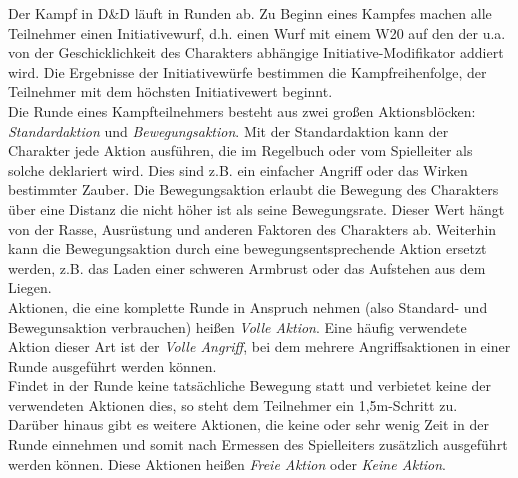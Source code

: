 Der Kampf in D\&D läuft in Runden ab. Zu Beginn eines Kampfes machen alle Teilnehmer einen Initiativewurf, d.h. einen Wurf mit einem W20 auf den der u.a. von der Geschicklichkeit des Charakters abhängige Initiative-Modifikator addiert wird. Die Ergebnisse der Initiativewürfe bestimmen die Kampfreihenfolge, der Teilnehmer mit dem höchsten Initiativewert beginnt.\\
Die Runde eines Kampfteilnehmers besteht aus zwei großen Aktionsblöcken: \emph{Standardaktion} und \emph{Bewegungsaktion}. Mit der Standardaktion kann der Charakter jede Aktion ausführen, die im Regelbuch oder vom Spielleiter als solche deklariert wird. Dies sind z.B. ein einfacher Angriff oder das Wirken bestimmter Zauber. Die Bewegungsaktion erlaubt die Bewegung des Charakters über eine Distanz die nicht höher ist als seine Bewegungsrate. Dieser Wert hängt von der Rasse, Ausrüstung und anderen Faktoren des Charakters ab. Weiterhin kann die Bewegungsaktion durch eine bewegungsentsprechende Aktion ersetzt werden, z.B. das Laden einer schweren Armbrust oder das Aufstehen aus dem Liegen.\\
Aktionen, die eine komplette Runde in Anspruch nehmen (also Standard- und Bewegunsaktion verbrauchen) heißen \emph{Volle %
Aktion}. Eine häufig verwendete Aktion dieser Art ist der \emph{Volle Angriff}, bei dem mehrere Angriffsaktionen in einer Runde ausgeführt werden können.\\
Findet in der Runde keine tatsächliche Bewegung statt und verbietet keine der verwendeten Aktionen dies, so steht dem Teilnehmer ein 1,5m-Schritt zu.\\
Darüber hinaus gibt es weitere Aktionen, die keine oder sehr wenig Zeit in der Runde einnehmen und somit nach Ermessen des Spielleiters zusätzlich ausgeführt werden können. Diese Aktionen heißen \emph{Freie Aktion} oder \emph{Keine Aktion}.

